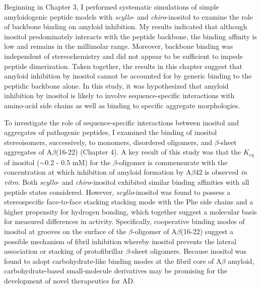 Beginning in Chapter 3, I performed systematic simulations of simple amyloidogenic peptide models with \textit{scyllo}- and \textit{chiro}-inositol to examine the role of backbone binding on amyloid inhibition. My results indicated that although inositol predominately interacts with the peptide backbone, the binding affinity is low and remains in the millimolar range. Moreover, backbone binding was independent of stereochemistry and did not appear to be sufficient to impede peptide dimerization. Taken together, the results in this chapter suggest that amyloid inhibition by inositol cannot be accounted for by generic binding to the peptidic backbone alone. In this study, it was hypothesized that amyloid inhibition by inositol is likely to involve sequence-specific interactions with amino-acid side chains as well as binding to specific aggregate morphologies.

To investigate the role of sequence-specific interactions between inositol and aggregates of pathogenic peptides, I examined the binding of inositol stereoisomers, successively, to monomers, disordered oligomers, and $\beta$-sheet aggregates of A$\beta$(16-22) (Chapter 4). A key result of this study was that the $K_{eq}$ of inositol ($\sim$0.2 - 0.5 mM) for the $\beta$-oligomer is commensurate with the concentration at which inhibition of amyloid formation by A$\beta$42 is observed \emph{in vitro}. Both \emph{scyllo}- and \emph{chiro}-inositol exhibited similar binding affinities with all peptide states considered. However,  \textit{scyllo}-inositol was found to possess a stereospecific face-to-face stacking stacking mode with the Phe side chains and a higher propensity for hydrogen bonding, which together suggest a molecular basis for measured differences in activity.  Specifically, cooperative binding modes of inositol at grooves on the surface of the $\beta$-oligomer of A$\beta$(16-22) suggest a possible mechanism of fibril inhibition whereby inositol prevents the lateral association or stacking of protofibrillar $\beta$-sheet oligomers. Because inositol was found to adopt carbohydrate-like binding modes at the fibril core of A$\beta$ amyloid, carbohydrate-based small-molecule derivatives may be promising for the development of novel therapeutics for AD.

